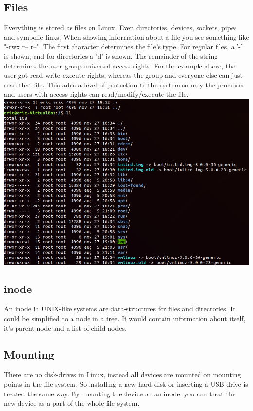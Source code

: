 \documentclass[12pt]{article}
\begin{document}
\subsection{Files}
Everything is stored as files on Linux. Even directories, devices, sockets, pipes and symbolic links.
When showing information about a file you see something like "-rwx r-- r--". 
The first character determines the file's type. For regular files, a '-' is shown, and for directories a 'd' is shown. 
The remainder of the string determines the user-group-universal access-rights. 
For the example above, the user got read-write-execute rights, whereas the group and everyone else can just read that file.
This adds a level of protection to the system so only the processes and users with access-rights can read/modify/execute the file.\\
\includegraphics[scale=0.5]{imgs/fs.png}

\subsection{inode}
An inode in UNIX-like systems are data-structures for files and directories. 
It could be simplified to a node in a tree. It would contain information about itself, it's parent-node and a list of child-nodes.

\subsection{Mounting}
There are no disk-drives in Linux, instead all devices are mounted on mounting points in the file-system. 
So installing a new hard-disk or inserting a USB-drive is treated the same way.
By mounting the device on an inode, you can treat the new device as a part of the whole file-system.
\end{document}
